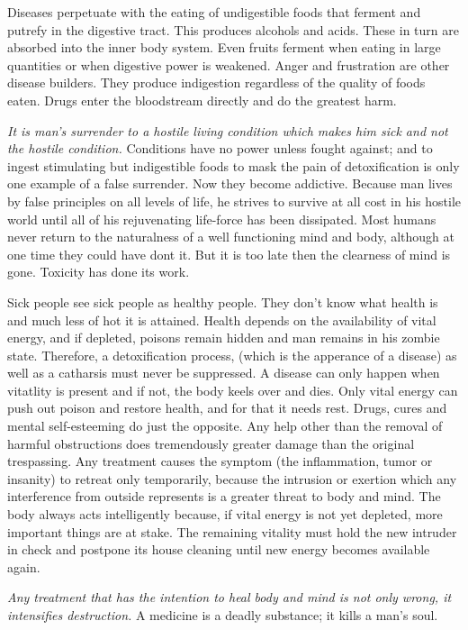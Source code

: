\documentclass[landscape,twocolumn,letterpaper]{article}
\begin{document}
Diseases perpetuate with the eating of undigestible foods that ferment
and putrefy in the digestive tract. This produces alcohols and
acids. These in turn are absorbed into the inner body system. Even
fruits ferment when eating in large quantities or when digestive power
is weakened. Anger and frustration are other disease builders. They
produce indigestion regardless of the quality of foods eaten. Drugs
enter the bloodstream directly and do the greatest harm.

\emph{It is man's surrender to a hostile living condition which makes
him sick and not the hostile condition.} Conditions have no power
unless fought against; and to ingest stimulating but indigestible
foods to mask the pain of detoxification is only one example of a
false surrender. Now they become addictive. Because man lives by false
principles on all levels of life, he strives to survive at all cost in
his hostile world until all of his rejuvenating life-force has been
dissipated. Most humans never return to the naturalness of a well
functioning mind and body, although at one time they could have dont
it. But it is too late then the clearness of mind is gone. Toxicity
has done its work.

Sick people see sick people as healthy people. They don't know what
health is and much less of hot it is attained. Health depends on the
availability of vital energy, and if depleted, poisons remain hidden
and man remains in his zombie state. Therefore, a detoxification
process, (which is the apperance of a disease) as well as a catharsis
must never be suppressed. A disease can only happen when vitatlity is
present and if not, the body keels over and dies. Only vital energy
can push out poison and restore health, and for that it needs
rest. Drugs, cures and mental self-esteeming do just the opposite. Any
help other than the removal of harmful obstructions does tremendously
greater damage than the original trespassing. Any treatment causes the
symptom (the inflammation, tumor or insanity) to retreat only
temporarily, because the intrusion or exertion which any interference
from outside represents is a greater threat to body and mind. The body
always acts intelligently because, if vital energy is not yet
depleted, more important things are at stake. The remaining vitality
must hold the new intruder in check and postpone its house cleaning
until new energy becomes available again.

\emph{Any treatment that has the intention to heal body and mind is
not only wrong, it intensifies destruction.} A medicine is a deadly
substance; it kills a man's soul.
\end{document}
